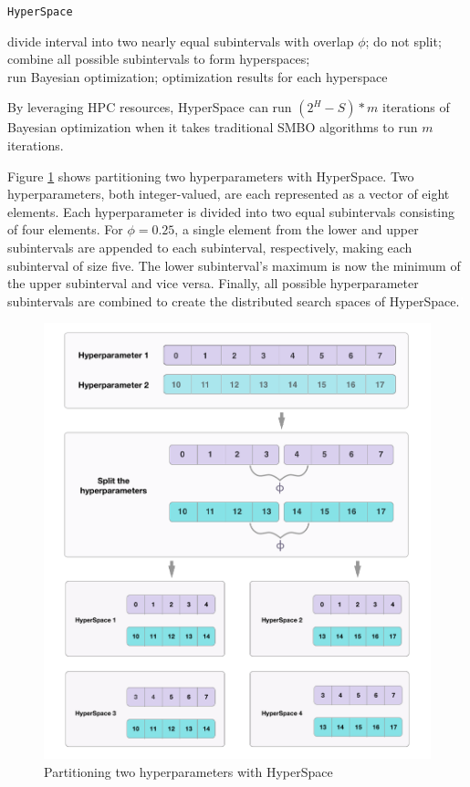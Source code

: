 \begin{algorithm}[H] 
	\caption{\texttt{HyperSpace}}
	{
		{
			divide interval into two nearly equal subintervals with overlap $\phi$;
		}
		{
			do not split;
		}
	}
	combine all possible subintervals to form hyperspaces;\\
	{
		run Bayesian optimization;
	}
	\Return optimization results for each hyperspace
\end{algorithm}
\vspace{2em}
By leveraging HPC resources, HyperSpace\textcolor{white}{"}can run $(2^H-S) * m$ iterations of Bayesian optimization when it takes traditional SMBO algorithms to run $m$ iterations.

Figure \ref{fig:hspex} shows partitioning two hyperparameters with HyperSpace. Two hyperparameters, both integer-valued, are each represented as a vector of eight elements. 
Each hyperparameter is divided into two equal subintervals consisting of four elements. 
For $\phi = 0.25$, a single element from the lower and upper subintervals are appended to each subinterval, respectively, making each subinterval of size five. The lower subinterval's maximum is now the minimum of the upper subinterval and vice versa. 
Finally, all possible hyperparameter subintervals are combined to create the distributed search spaces of HyperSpace.\textcolor{white}{"}


\begin{figure}[H]
	\centering
	\includegraphics[scale=0.43]{figures/hyperspace-example.png}
	\caption{Partitioning two hyperparameters with HyperSpace}
	\label{fig:hspex}
\end{figure}
